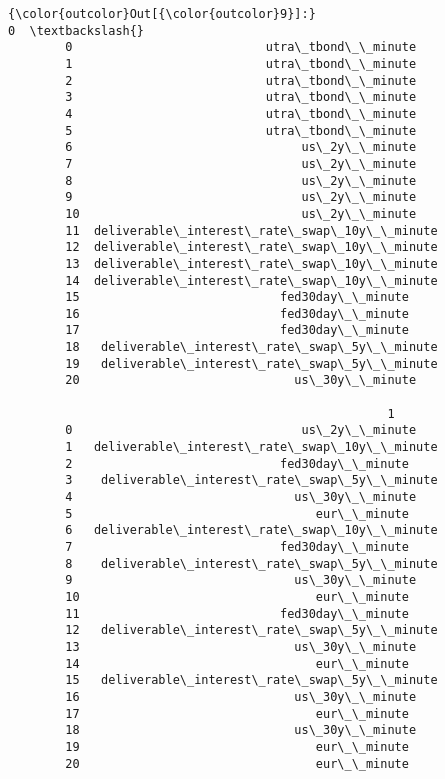 \documentclass[11pt]{article}
\begin{document}
\begin{Verbatim}[commandchars=\\\{\}]
{\color{outcolor}Out[{\color{outcolor}9}]:}                                              0  \textbackslash{}
        0                           utra\_tbond\_\_minute   
        1                           utra\_tbond\_\_minute   
        2                           utra\_tbond\_\_minute   
        3                           utra\_tbond\_\_minute   
        4                           utra\_tbond\_\_minute   
        5                           utra\_tbond\_\_minute   
        6                                us\_2y\_\_minute   
        7                                us\_2y\_\_minute   
        8                                us\_2y\_\_minute   
        9                                us\_2y\_\_minute   
        10                               us\_2y\_\_minute   
        11  deliverable\_interest\_rate\_swap\_10y\_\_minute   
        12  deliverable\_interest\_rate\_swap\_10y\_\_minute   
        13  deliverable\_interest\_rate\_swap\_10y\_\_minute   
        14  deliverable\_interest\_rate\_swap\_10y\_\_minute   
        15                            fed30day\_\_minute   
        16                            fed30day\_\_minute   
        17                            fed30day\_\_minute   
        18   deliverable\_interest\_rate\_swap\_5y\_\_minute   
        19   deliverable\_interest\_rate\_swap\_5y\_\_minute   
        20                              us\_30y\_\_minute   
        
                                                     1  
        0                                us\_2y\_\_minute  
        1   deliverable\_interest\_rate\_swap\_10y\_\_minute  
        2                             fed30day\_\_minute  
        3    deliverable\_interest\_rate\_swap\_5y\_\_minute  
        4                               us\_30y\_\_minute  
        5                                  eur\_\_minute  
        6   deliverable\_interest\_rate\_swap\_10y\_\_minute  
        7                             fed30day\_\_minute  
        8    deliverable\_interest\_rate\_swap\_5y\_\_minute  
        9                               us\_30y\_\_minute  
        10                                 eur\_\_minute  
        11                            fed30day\_\_minute  
        12   deliverable\_interest\_rate\_swap\_5y\_\_minute  
        13                              us\_30y\_\_minute  
        14                                 eur\_\_minute  
        15   deliverable\_interest\_rate\_swap\_5y\_\_minute  
        16                              us\_30y\_\_minute  
        17                                 eur\_\_minute  
        18                              us\_30y\_\_minute  
        19                                 eur\_\_minute  
        20                                 eur\_\_minute  
\end{Verbatim}
            
\end{document}
